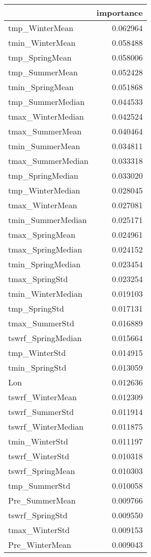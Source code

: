 \begin{tabular}{lr}
\toprule
 & importance \\
\midrule
tmp_WinterMean & 0.062964 \\
tmin_WinterMean & 0.058488 \\
tmp_SpringMean & 0.058006 \\
tmp_SummerMean & 0.052428 \\
tmin_SpringMean & 0.051868 \\
tmp_SummerMedian & 0.044533 \\
tmax_WinterMedian & 0.042524 \\
tmax_SummerMean & 0.040464 \\
tmin_SummerMean & 0.034811 \\
tmax_SummerMedian & 0.033318 \\
tmp_SpringMedian & 0.033020 \\
tmp_WinterMedian & 0.028045 \\
tmax_WinterMean & 0.027081 \\
tmin_SummerMedian & 0.025171 \\
tmax_SpringMean & 0.024961 \\
tmax_SpringMedian & 0.024152 \\
tmin_SpringMedian & 0.023454 \\
tmax_SpringStd & 0.023254 \\
tmin_WinterMedian & 0.019103 \\
tmp_SpringStd & 0.017131 \\
tmax_SummerStd & 0.016889 \\
tswrf_SpringMedian & 0.015664 \\
tmp_WinterStd & 0.014915 \\
tmin_SpringStd & 0.013059 \\
Lon & 0.012636 \\
tswrf_WinterMean & 0.012309 \\
tswrf_SummerStd & 0.011914 \\
tswrf_WinterMedian & 0.011875 \\
tmin_WinterStd & 0.011197 \\
tswrf_WinterStd & 0.010318 \\
tswrf_SpringMean & 0.010303 \\
tmp_SummerStd & 0.010058 \\
Pre_SummerMean & 0.009766 \\
tswrf_SpringStd & 0.009550 \\
tmax_WinterStd & 0.009153 \\
Pre_WinterMean & 0.009043 \\

\end{tabular}
